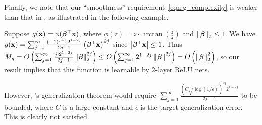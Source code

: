 Finally, we note that our ``smoothness'' requirement~\eqref{eqn:g_complexity} is weaker than that in \citep{allen2018learning}, as illustrated in the following example.
\begin{example}
	Suppose $g(\mathbf{x}) = \phi(\bm{\beta}^\top \mathbf{x})$, where $\phi(z) = z \cdot \arctan(\frac z2)$ and $\left\|\bm{\beta}\right\|_2 \le 1$.
	We have $g(\mathbf{x}) =   \sum_{j=1}^\infty \frac{(-1)^{j-1} 2^{1 - 2 j} }{2 j - 1} \left( \bm{\beta}^\top \mathbf{x} \right)^{2j}$ since $\left|\bm{\beta}^\top \mathbf{x}\right| \le 1$.
	Thus $M_g = O \left( \sum_{j=1}^\infty \frac{j \cdot 2^{1 - 2 j} }{2 j - 1}  \left\|\bm{\beta}\right\|_2^{2j} \right) \le O \left( \sum_{j=1}^\infty 2^{1 - 2 j}  \left\|\bm{\beta}\right\|^{2j} \right) = O\left( \left\|\bm{\beta}\right\|_2^2 \right)$, so our result implies that this function is learnable by $2$-layer ReLU nets.
	
	
\end{example}
However, \citet{allen2018learning}'s generalization theorem would require $\sum_{j=1}^\infty \frac{\left(  C\sqrt{\log(1/\epsilon)} \right)^{2j} 2^{1 - 2 j} }{2 j - 1}  $ to be bounded, where $C$ is a large constant and $\epsilon$ is the target generalization error. This is clearly not satisfied.






\begin{comment}
\begin{figure}[t]
	\label{fig:improper}
	\subfigure[$d=10$]
	{
		\label{fig:improper_d_5}
		\texttt{[image: figs/mnist\_spectrum.png]}}   
	\subfigure[$d=5$]
	{
		\label{fig:improper_d_50}
		\texttt{[image: figs/mnist\_spectrum.png]}}   
	\caption{[Place holder] Learning specific functions by over-parameterized two-layer neural networks. }
\end{figure}

\end{comment}

 


